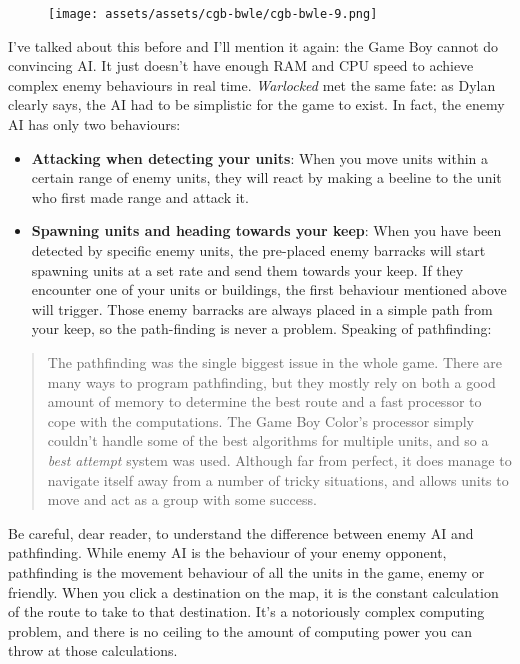 \documentclass{book}
\begin{document}
\begin{figure}[hbt]
\vskip 10pt
\centering \texttt{[image: assets/assets/cgb-bwle/cgb-bwle-9.png]}
\vskip 6pt
\end{figure}

I’ve talked about this before and I’ll mention it again: the Game Boy cannot do convincing AI. It just doesn’t have enough RAM and CPU speed to achieve complex enemy behaviours in real time. \emph{Warlocked} met the same fate: as Dylan clearly says, the AI had to be simplistic for the game to exist. In fact, the enemy AI has only two behaviours:

\begin{itemize} [nosep]
\item \textbf{Attacking when detecting your units}: When you move units within a certain range of enemy units, they will react by making a beeline to the unit who first made range and attack it.
\item \textbf{Spawning units and heading towards your keep}: When you have been detected by specific enemy units, the pre-placed enemy barracks will start spawning units at a set rate and send them towards your keep. If they encounter one of your units or buildings, the first behaviour mentioned above will trigger. Those enemy barracks are always placed in a simple path from your keep, so the path-finding is never a problem. Speaking of pathfinding:
\end{itemize}\noindent

\begin{quote}
The pathfinding was the single biggest issue in the whole game. There are many ways to program pathfinding, but they mostly rely on both a good amount of memory to determine the best route and a fast processor to cope with the computations. The Game Boy Color’s processor simply couldn’t handle some of the best algorithms for multiple units, and so a \emph{best attempt} system was used. Although far from perfect, it does manage to navigate itself away from a number of tricky situations, and allows units to move and act as a group with some success.
\end{quote} \par

Be careful, dear reader, to understand the difference between enemy AI and pathfinding. While enemy AI is the behaviour of your enemy opponent, pathfinding is the movement behaviour of all the units in the game, enemy or friendly. When you click a destination on the map, it is the constant calculation of the route to take to that destination. It’s a notoriously complex computing problem, and there is no ceiling to the amount of computing power you can throw at those calculations.
\end{document}
